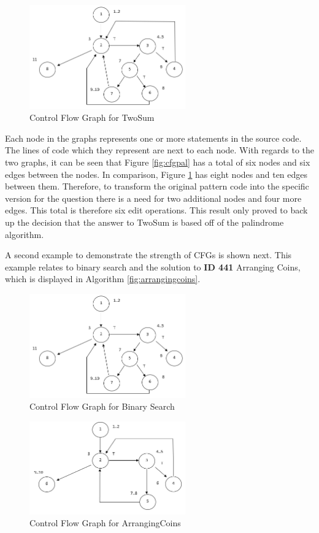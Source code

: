 \documentclass[10pt,twocolumn]{IEEEtran}
\begin{document}
 \begin{figure}[h]
\includegraphics[width=0.6\textwidth]{CFGTwoSum.png}
\caption{Control Flow Graph for TwoSum}
\label{fig:cfgtwosum}
\end{figure}
\par Each node in the graphs represents one or more statements in the source code. The lines of code which they represent are next to each node. With regards to the two graphs, it can be seen that Figure \ref{fig:cfgpal} has a total of six nodes and six edges between the nodes. In comparison, Figure \ref{fig:cfgtwosum} has eight nodes and ten edges between them. Therefore, to transform the original pattern code into the specific version for the question there is a need for two additional nodes and four more edges. This total is therefore six edit operations. This result only proved to back up the decision that the answer to TwoSum is based off of the palindrome algorithm.
\par A second example to demonstrate the strength of CFGs is shown next. This example relates to binary search and the solution to \textbf{ID 441} Arranging Coins, which is displayed in Algorithm \ref{fig:arrangingcoins}. 
 \begin{figure}[h]
\includegraphics[width=0.6\textwidth]{CFGBinarySearch.png}
\caption{Control Flow Graph for Binary Search}
\label{fig:cfgbinarysearch}
\end{figure}
 \begin{figure}[h]
\includegraphics[width=0.6\textwidth]{CFGArrangingCoins.png}
\caption{Control Flow Graph for ArrangingCoins}
\label{fig:cfgbinarysearch}
\end{figure}
\end{document}
